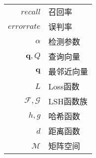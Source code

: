 \begin{nomenclaturename}
\label{chap:symb}

\begin{longtable}{rl}
$recall$     & 召回率 \\
$errorrate$  & 误判率 \\
$\alpha$	 & 检测参数 \\
$\mathbf{q},Q$ & 查询向量 \\
$\mathbf{q}$ & 最邻近向量 \\
$L$			 & Loss函数 \\
$\mathcal{F},\mathcal{G}$ & LSH函数族 \\
$h,g$ 		 & 哈希函数 \\
$d$			 & 距离函数 \\
$\mathcal{M}$& 矩阵空间 


\end{longtable}

\end{nomenclaturename}
